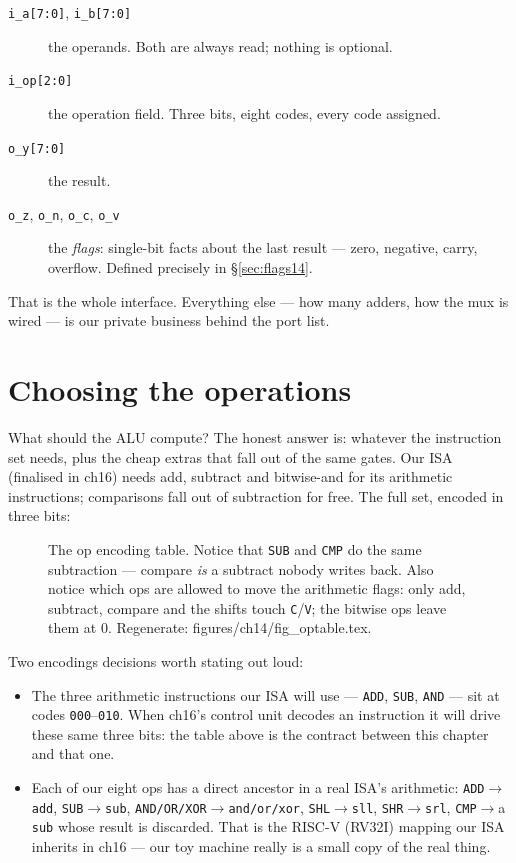 \begin{description}
\item[\texttt{i\_a[7:0]}, \texttt{i\_b[7:0]}] the operands. Both are
always read; nothing is optional.
\item[\texttt{i\_op[2:0]}] the operation field. Three bits, eight
codes, every code assigned.
\item[\texttt{o\_y[7:0]}] the result.
\item[\texttt{o\_z}, \texttt{o\_n}, \texttt{o\_c}, \texttt{o\_v}] the
\emph{flags}: single-bit facts about the last result ---
zero, negative, carry, overflow. Defined precisely in
\S\ref{sec:flags14}.
\end{description}

That is the whole interface. Everything else --- how many adders, how
the mux is wired --- is our private business behind the port list.

\section{Choosing the operations}\label{sec:opset14}

What should the ALU compute? The honest answer is: whatever the
instruction set needs, plus the cheap extras that fall out of the same
gates. Our ISA (finalised in ch16) needs add, subtract and
bitwise-and for its arithmetic instructions; comparisons fall out of
subtraction for free. The full set, encoded in three bits:

\begin{figure}[htbp]
\centering

\caption{The op encoding table. Notice that \texttt{SUB} and
\texttt{CMP} do the same subtraction --- compare \emph{is} a subtract
nobody writes back. Also notice which ops are allowed to move the
arithmetic flags: only add, subtract, compare and the shifts touch
\texttt{C}/\texttt{V}; the bitwise ops leave them at 0.
Regenerate: \ttfamily figures/ch14/fig\_optable.tex.}
\label{fig:optable14}
\end{figure}

Two encodings decisions worth stating out loud:

\begin{itemize}
\item The three arithmetic instructions our ISA will use ---
\texttt{ADD}, \texttt{SUB}, \texttt{AND} --- sit at codes
\texttt{000}--\texttt{010}. When ch16's control unit decodes an
instruction it will drive these same three bits: the table above is
the contract between this chapter and that one.
\item Each of our eight ops has a direct ancestor in a real ISA's
arithmetic: \texttt{ADD}$\to$\texttt{add}, \texttt{SUB}$\to$\texttt{sub},
\texttt{AND/OR/XOR}$\to$\texttt{and/or/xor},
\texttt{SHL}$\to$\texttt{sll}, \texttt{SHR}$\to$\texttt{srl},
\texttt{CMP}$\to$a \texttt{sub} whose result is discarded. That is the
RISC-V (RV32I) mapping our ISA inherits in ch16 --- our toy machine
really is a small copy of the real thing.
\end{itemize}

